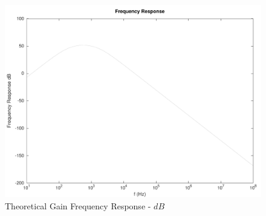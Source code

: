 \begin{figure}[H]
      \includegraphics[width=\linewidth]{../mat/fresponse1.pdf}
      \caption{Theoretical Gain Frequency Response - $dB$}
    \endminipage\hfill
\end{figure}


